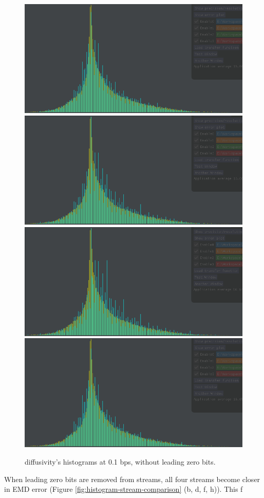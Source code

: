 \begin{figure}
	\centering
	{\includegraphics[width=0.24\linewidth]{img/histogram/diffusivity/histogram.png}}
	{\includegraphics[width=0.24\linewidth]{img/histogram/diffusivity/rmse.png}}
	{\includegraphics[width=0.24\linewidth]{img/histogram/diffusivity/wavenorm.png}}
	{\includegraphics[width=0.24\linewidth]{img/histogram/diffusivity/signature.png}}
	\caption{diffusivity's histograms at 0.1 bps, without leading zero bits. }
	\label{fig:histogram-comparison-low-bit-rate-slz}
\end{figure}

When leading zero bits are removed from streams, all four streams become closer in EMD error (Figure
\ref{fig:histogram-stream-comparison} (b, d, f, h)). This f
